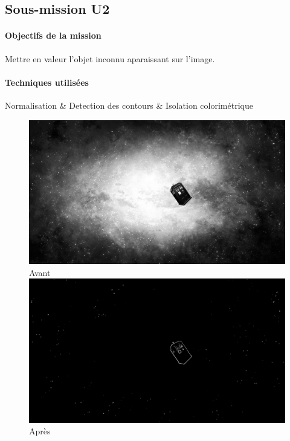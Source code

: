 \subsection{Sous-mission U2}

	\begin{vwcol}[widths={0.65,0.2}, rule=0pt]
	\begin{minipage}{0.7\textwidth}
	\paragraph{Objectifs de la mission}

	Mettre en valeur l'objet inconnu aparaissant sur l'image.
	\end{minipage}

	\begin{minipage}{0.3\textwidth}
	\begin{flushright}
	\paragraph{Techniques utilisées}

	Normalisation \& Detection des contours \& Isolation colorimétrique
	\end{flushright}
	\end{minipage}

	\end{vwcol} 

	\begin{figure}[h]
	\centering
		\begin{multicols}{2}
		\includegraphics[scale=0.27]{images/U2_surface.png}
		Avant
		\includegraphics[scale=0.27]{images/MissionU2.png}
		Après
		\end{multicols}
	\end{figure}
	\vspace{-0.9cm}

